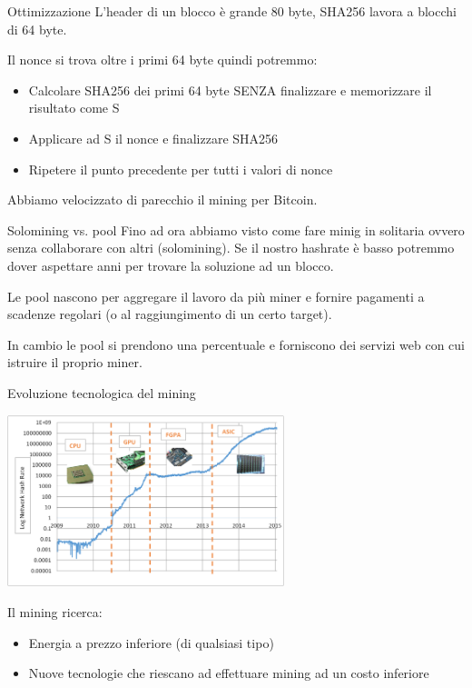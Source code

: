 \documentclass[aspectratio=169]{beamer}
\begin{document}
\begin{frame}{Ottimizzazione}
    L'header di un blocco è grande 80 byte, SHA256 lavora a blocchi di 64 byte.

    Il nonce si trova oltre i primi 64 byte quindi potremmo:
    \begin{itemize}
        \item Calcolare SHA256 dei primi 64 byte SENZA finalizzare e memorizzare il risultato come S
        \item Applicare ad S il nonce e finalizzare SHA256
        \item Ripetere il punto precedente per tutti i valori di nonce
    \end{itemize}

    Abbiamo velocizzato di parecchio il mining per Bitcoin.
\end{frame}

\begin{frame}{Solomining vs. pool}
    Fino ad ora abbiamo visto come fare minig in solitaria ovvero senza collaborare con altri (solomining).
    Se il nostro hashrate è basso potremmo dover aspettare anni per trovare la soluzione ad un blocco.
    
    Le pool nascono per aggregare il lavoro da più miner e fornire pagamenti a scadenze regolari (o al raggiungimento di un certo target).

    In cambio le pool si prendono una percentuale e forniscono dei servizi web con cui istruire il proprio miner.
\end{frame}

\begin{frame}{Evoluzione tecnologica del mining}
    \begin{center}
        \includegraphics[height=5cm]{hashrate.png}
    \end{center}     

    Il mining ricerca:
    \begin{itemize}
        \item Energia a prezzo inferiore (di qualsiasi tipo)
        \item Nuove tecnologie che riescano ad effettuare mining ad un costo inferiore
    \end{itemize}
\end{frame}
\end{document}
